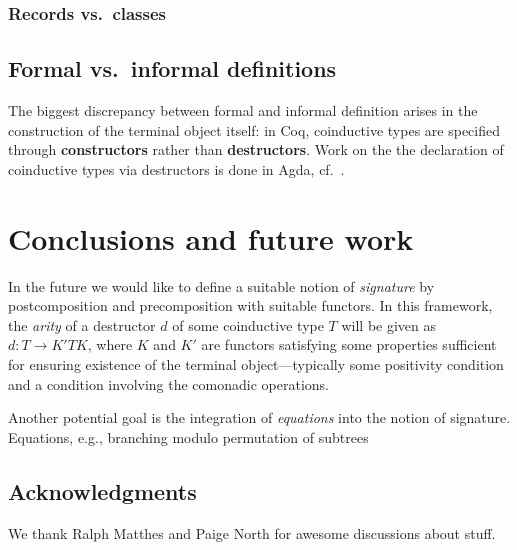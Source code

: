 \documentclass{amsart}
\newcommand{\fat}[1]{\textbf{#1}}
\begin{document}
\subsubsection{Records vs.\ classes}

\subsection{Formal vs.\ informal definitions}


The biggest discrepancy between formal and informal definition arises in the construction of the terminal object itself:
in \textsf{Coq}, coinductive types are specified through \fat{constructors} rather than \fat{destructors}.
Work on the the declaration of coinductive types via destructors is done in \textsf{Agda}, cf.\ \parencite{DBLP:conf/popl/AbelPTS13}.

\section{Conclusions and future work}


In the future we would like to define a suitable notion of \emph{signature} 
by postcomposition and precomposition with suitable functors. In this framework, the \emph{arity} of 
a destructor $d$ of some coinductive type $T$ will be given as $d : T \to K'TK$, where $K$ and $K'$ are 
functors satisfying some properties sufficient for ensuring existence of the terminal object---typically some 
positivity condition and a condition involving the comonadic operations.
 
Another potential goal is the integration of \emph{equations} into the notion of signature. 
 Equations, e.g., branching modulo permutation of subtrees

\subsection*{Acknowledgments}
 We thank Ralph Matthes and Paige North for awesome discussions about stuff.

\printbibliography

\appendix


\end{document}
